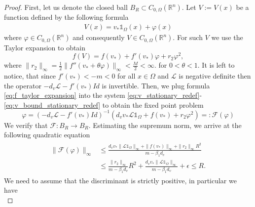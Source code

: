 \documentclass[11pt, a4paper]{article}
\theoremstyle{break}
\theoremstyle{break}
\theoremstyle{break}
\theoremstyle{break}
\theoremstyle{break}
\theoremstyle{break}
\theoremstyle{break}
\theoremstyle{break}
\theoremstyle{break}
\begin{document}
\begin{proof}
    First, let us denote the closed ball $B_R \subset C_{0, \Omega}(\mathbb{R}^n)$. 
    Let $V:= V(x)$ be a function defined by the following formula
    \begin{align}
        \label{eq:stationary_u_definition}
        V(x) 
        = 
        v_* \mathds{1}_{\Omega}(x) + \varphi(x)
    \end{align}
    where $\varphi \in C_{0, \Omega}(\mathbb{R}^n)$ and consequently $V \in C_{0, \Omega}(\mathbb{R}^n)$. For such $V$ we use the Taylor expansion to obtain
    \begin{equation}
        \label{eq:f_taylor_expansion}
        f(V) = f(v_*) + f'(v_*) \varphi + r_2 \varphi^2,
    \end{equation}
    where $\|r_2\|_\infty = \frac{1}{2}\|f''(v_* + \theta\varphi)\|_\infty < \frac{M}{2} < \infty$. for $0 < \theta < 1$. It is left to notice, that since $f'(v_*) < -m < 0$ for all $x \in \Omega$ and $\mathcal{L}$ is negative definite then the operator $-d_v\mathcal{L} - f'(v_*) Id$ is invertible. Then, we plug formula \eqref{eq:f_taylor_expansion} into the system \eqref{eq:v_stationary_redef}-\eqref{eq:v_bound_stationary_redef} to obtain the fixed point problem
    \begin{equation}
        \label{eq:fixed_point_formulation}
        \varphi = \left( -d_v \mathcal{L} - f'(v_*) Id  \right)^{-1} \left( d_v v_* \mathcal{L} \mathds{1}_\Omega + f(v_*) + r_2 \varphi^2 \right) =: \mathcal{F}(\varphi)
    \end{equation}
    We verify that $\mathcal{F}: B_R \rightarrow B_R$. Estimating the supremum norm, we arrive at the following quadratic equation
    \begin{align}
        \label{eq:f_ball_to_ball_condition_1}
        \begin{split}
            \| \mathcal{F}(\varphi) \|_\infty 
            &\leq
            \frac{d_v v_* \|\mathcal{L}\mathds{1}_\Omega\|_\infty + \|f(v_*)\|_\infty + \|r_2\|_\infty R^2}{m - \beta_1 d_v}
            \\
            &\leq
            \frac{\|r_2\|_\infty}{m - \beta_1 d_v} R^2 
            +
            \frac{d_v v_* \|\mathcal{L}\mathds{1}_\Omega\|_\infty}{m - \beta_1 d_v}
            +
            \epsilon
            \leq R.
        \end{split}
    \end{align}
    We need to assume that the discriminant is strictly positive, in particular we have
    \begin{equation}

\end{equation}
\end{proof}
\end{document}
